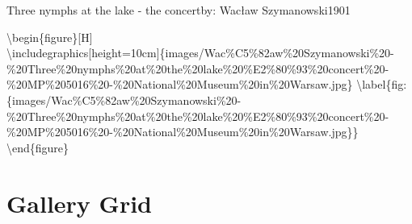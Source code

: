 \documentclass[
  a4paper,
]{book}
\begin{document}
\label{http:ux2fux2fwww.wikidata.orgux2fentityux2fQ24325535}
Three nymphs at the lake - the concertby: Wacław Szymanowski1901

\textbackslash begin\{figure\}{[}H{]}\\
\textbackslash includegraphics{[}height=10cm{]}\{images/Wac\%C5\%82aw\%20Szymanowski\%20-\%20Three\%20nymphs\%20at\%20the\%20lake\%20\%E2\%80\%93\%20concert\%20-\%20MP\%205016\%20-\%20National\%20Museum\%20in\%20Warsaw.jpg\}
\textbackslash label\{fig:\{images/Wac\%C5\%82aw\%20Szymanowski\%20-\%20Three\%20nymphs\%20at\%20the\%20lake\%20\%E2\%80\%93\%20concert\%20-\%20MP\%205016\%20-\%20National\%20Museum\%20in\%20Warsaw.jpg\}\}
\textbackslash end\{figure\}


\chapter{Gallery Grid}\label{gallery-grid}
\end{document}
